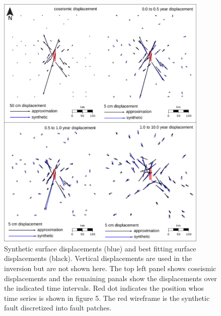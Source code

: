 \documentclass[12pt]{article}
\begin{document}
\begin{figure}[h!]\label{figure4}
  \centering
  \includegraphics[width=0.9\textwidth]{FinalFigures/Figure4.pdf}
  \caption{Synthetic surface displacements (blue) and best fitting
    surface displacements (black).  Vertical displacements are used in
    the inversion but are not shown here.  The top left panel shows
    coseismic displacements and the remaining panals show the
    displacements over the indicated time intervals. Red dot indicates
    the position whos time series is shown in figure 5. The red wireframe
    is the synthetic fault discretized into fault patches.}
  \label{figure 4}
\end{figure}
\end{document}
